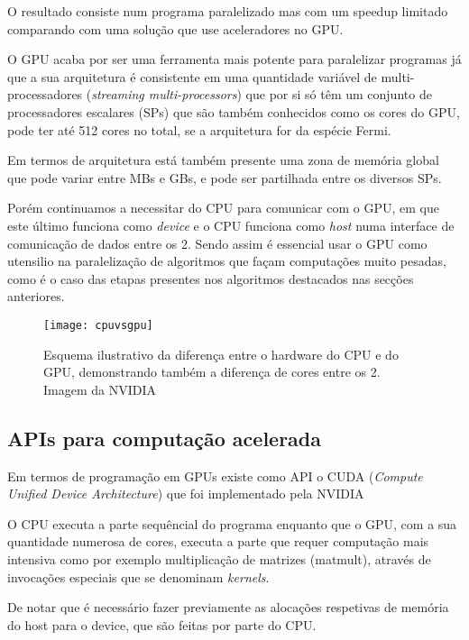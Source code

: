  O resultado consiste num programa paralelizado mas com um speedup limitado comparando com uma solução que use aceleradores no GPU.
 
 O GPU acaba por ser uma ferramenta mais potente para paralelizar programas já que a sua arquitetura é consistente em uma quantidade variável de multi-processadores (\textit{streaming multi-processors}) \cite{ritchiew} que por si só têm um conjunto de processadores escalares (SPs) que são também conhecidos como os cores do GPU, pode ter até 512 cores no total, se a arquitetura for da espécie Fermi. \cite{wittenbrink2011fermi}
 
 Em termos de arquitetura está também presente uma zona de memória global que pode variar entre MBs e GBs, e pode  ser partilhada entre os diversos SPs.
 
Porém continuamos a necessitar do CPU para comunicar com o GPU, em que este último funciona como \textit{device} e o CPU funciona como \textit{host} numa interface de comunicação de dados entre os 2.
Sendo assim é essencial usar o GPU como utensilio na paralelização de algoritmos que façam computações muito pesadas, como é o caso das etapas presentes nos algoritmos destacados nas secções anteriores.

 \begin{figure}[ht]
  \centering
    {\texttt{[image: cpuvsgpu]}}
  \caption{Esquema ilustrativo da diferença entre o hardware do CPU e do GPU, demonstrando também a diferença de cores entre os 2. Imagem da NVIDIA}
  \label{fig:fig2subfig}
\end{figure}

 
\subsection{APIs para computação acelerada}
\label {cuda}
Em termos de programação em GPUs existe como API o CUDA (\textit{Compute Unified Device Architecture}) que foi implementado pela NVIDIA 
 
 O CPU executa a parte sequêncial do programa enquanto que o GPU, com a sua quantidade numerosa de cores, executa a parte que requer computação mais intensiva como por exemplo multiplicação de matrizes (matmult), através de invocações especiais que se denominam\textit{ kernels}.\cite{nvidia2011nvidia}
  
 De notar que é necessário fazer previamente as alocações respetivas de memória do host para o device, que são feitas por parte do CPU.
   
